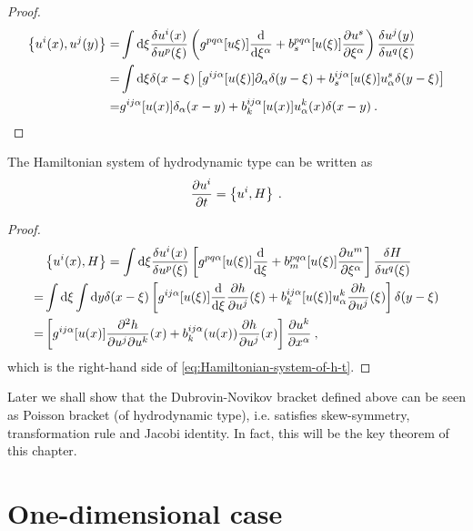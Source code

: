 \begin{proof}
    \begin{align}
        \left \lbrace u^i(x), u^j(y) \right \rbrace =& \int \mathrm{d} \xi \frac{\delta u^i(x)}{\delta u^p(\xi)} \left( g^{pq \alpha}[u\xi)] \frac{\mathrm{d}}{\mathrm{d}\xi^\alpha} + b^{pq \alpha}_s[u(\xi)] \frac{\partial u^s}{\partial \xi^\alpha} \right) \frac{\delta u^j(y)}{\delta u^q(\xi)} \nonumber
        \\ =& \int \mathrm{d} \xi \delta(x-\xi) \left[ g^{ij \alpha}[u(\xi)] \partial_\alpha \delta(y-\xi) + b^{ij \alpha}_s[u(\xi)] u^s_\alpha \delta(y- \xi) \right] \nonumber
        \\ =& g^{ij \alpha} [u(x)] \delta_\alpha(x-y) + b_k^{ij \alpha} [u(x)] u_\alpha^k(x) \delta(x-y) \:.
    \end{align}
\end{proof}

\begin{proposition}
    The Hamiltonian system of hydrodynamic type can be written as
    \begin{align}
        \frac{\partial u^i}{\partial t} = \left \lbrace u^i,H \right \rbrace \:.
    \end{align}
\end{proposition}
\begin{proof}
    \begin{align}
        &\left \lbrace u^i(x),H \right \rbrace 
        = \int \mathrm{d} \xi \frac{\delta u^i(x)}{\delta u^p(\xi)} \left[ g^{pq \alpha}[u(\xi)] \frac{\mathrm{d}}{\mathrm{d}\xi} + b^{pq \alpha}_m [u(\xi)] \frac{\partial u^m}{\partial \xi^\alpha} \right] \frac{\delta H}{\delta u^q(\xi)} \nonumber 
        \\ =& \int \mathrm{d} \xi \int \mathrm{d} y \delta(x-\xi) \left[  g^{ij \alpha} [u(\xi)] \frac{\mathrm{d}}{\mathrm{d}\xi} \frac{\partial h}{\partial u^j}(\xi)  + b^{ij \alpha}_k [u(\xi)] u^k_\alpha \frac{\partial h}{\partial u^j} (\xi) \right] \delta(y-\xi) \nonumber
        \\ =& \left[ g^{ij \alpha} [u(x)] \frac{\partial ^2 h}{\partial u^j \partial u^k}(x)  + b^{ij \alpha}_k(u(x)) \frac{\partial h}{\partial u^j}(x) \right] \frac{\partial u^k}{\partial x^\alpha} \:,
    \end{align}
    which is the right-hand side of \eqref{eq:Hamiltonian-system-of-h-t}.
\end{proof}

Later we shall show that the Dubrovin-Novikov bracket defined above can be seen as Poisson bracket (of hydrodynamic type), i.e. satisfies  skew-symmetry, transformation rule and Jacobi identity. In fact, this will be the key theorem of this chapter.

\section{One-dimensional case}

